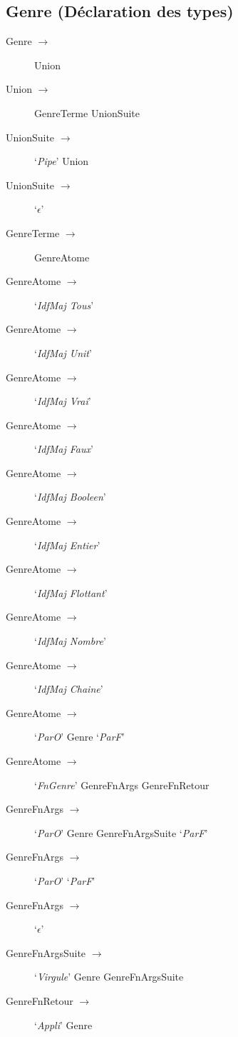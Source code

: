 \subsection{Genre (Déclaration des types)}
\begin{description}
   \item[Genre $\to$] Union
\end{description}
\begin{description}
   \item[Union $\to$] GenreTerme UnionSuite
   \item[UnionSuite $\to$] `\emph{Pipe}' Union
   \item[UnionSuite $\to$] `\emph{$\epsilon$}'
\end{description}
\begin{description}
   \item[GenreTerme $\to$] GenreAtome
\end{description}
\begin{description}
   \item[GenreAtome $\to$] `\emph{IdfMaj Tous}'
   \item[GenreAtome $\to$] `\emph{IdfMaj Unit}'
   \item[GenreAtome $\to$] `\emph{IdfMaj Vrai}'
   \item[GenreAtome $\to$] `\emph{IdfMaj Faux}'
   \item[GenreAtome $\to$] `\emph{IdfMaj Booleen}'
   \item[GenreAtome $\to$] `\emph{IdfMaj Entier}'
   \item[GenreAtome $\to$] `\emph{IdfMaj Flottant}'
   \item[GenreAtome $\to$] `\emph{IdfMaj Nombre}'
   \item[GenreAtome $\to$] `\emph{IdfMaj Chaine}'
   \item[GenreAtome $\to$] `\emph{ParO}' Genre `\emph{ParF}'
\end{description}
\begin{description}
   \item[GenreAtome $\to$] `\emph{FnGenre}' GenreFnArgs GenreFnRetour
   \item[GenreFnArgs $\to$] `\emph{ParO}' Genre GenreFnArgsSuite `\emph{ParF}'
   \item[GenreFnArgs $\to$] `\emph{ParO}' `\emph{ParF}'
   \item[GenreFnArgs $\to$] `\emph{$\epsilon$}'
   \item[GenreFnArgsSuite $\to$] `\emph{Virgule}' Genre GenreFnArgsSuite
   \item[GenreFnRetour $\to$] `\emph{Appli}' Genre
\end{description}

